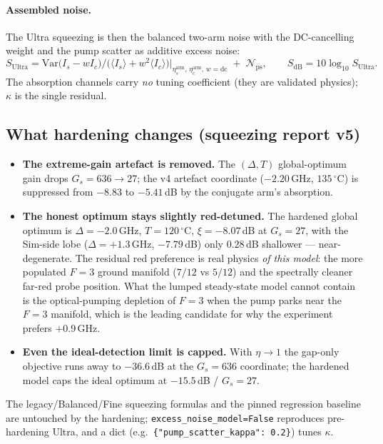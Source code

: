 \documentclass[11pt]{article}
\newcommand{\code}[1]{\texttt{#1}}
\begin{document}
\paragraph{Assembled noise.} The Ultra squeezing is then the balanced two-arm
noise with the DC-cancelling weight and the pump scatter as additive excess
noise:
\begin{equation}
S_{\text{Ultra}}
=\mathrm{Var}\big(I_s-wI_c\big)\big/\big(\langle I_s\rangle+w^2\langle
I_c\rangle\big)\Big|_{\eta_s^{\text{arm}},\,\eta_c^{\text{arm}},\,w=\text{dc}}
\;+\;\mathcal{N}_{\text{ps}},
\qquad
S_{\text{dB}}=10\log_{10}S_{\text{Ultra}}.
\label{eq:hardenedS}
\end{equation}
The absorption channels carry \emph{no} tuning coefficient (they are validated
physics); $\kappa$ is the single residual.

\subsection{What hardening changes (squeezing report v5)}

\begin{itemize}[leftmargin=1.6em]
  \item \textbf{The extreme-gain artefact is removed.} The $(\Delta,T)$
  global-optimum gain drops $G_s=636\to27$; the v4 artefact coordinate
  ($-2.20\,$GHz, $135\,^\circ$C) is suppressed from $-8.83$ to $-5.41\,$dB by
  the conjugate arm's absorption.
  \item \textbf{The honest optimum stays slightly red-detuned.} The hardened
  global optimum is $\Delta=-2.0\,$GHz, $T=120\,^\circ$C, $\xi=-8.07\,$dB at
  $G_s=27$, with the Sim-side lobe ($\Delta=+1.3\,$GHz, $-7.79\,$dB) only
  $0.28\,$dB shallower --- near-degenerate. The residual red preference is real
  physics \emph{of this model}: the more populated $F=3$ ground manifold
  ($7/12$ vs $5/12$) and the spectrally cleaner far-red probe position. What the
  lumped steady-state model cannot contain is the optical-pumping depletion of
  $F=3$ when the pump parks near the $F=3$ manifold, which is the leading
  candidate for why the experiment prefers $+0.9\,$GHz.
  \item \textbf{Even the ideal-detection limit is capped.} With $\eta\to1$ the
  gap-only objective runs away to $-36.6\,$dB at the $G_s=636$ coordinate; the
  hardened model caps the ideal optimum at $-15.5\,$dB / $G_s=27$.
\end{itemize}
The legacy/Balanced/Fine squeezing formulas and the pinned regression baseline
are untouched by the hardening; \code{excess\_noise\_model=False} reproduces
pre-hardening Ultra, and a dict (e.g.\
\code{\{"pump\_scatter\_kappa": 0.2\}}) tunes $\kappa$.
\end{document}
